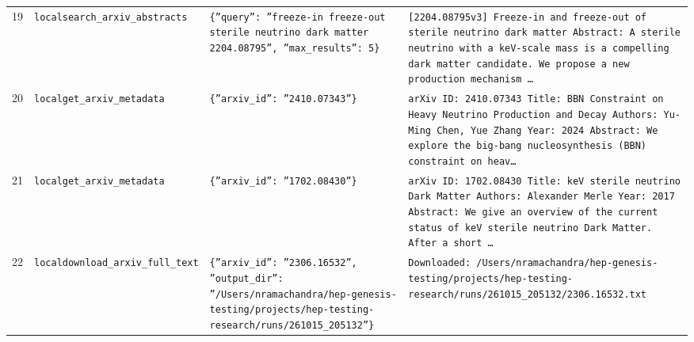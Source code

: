 \documentclass[11pt,a4paper]{article}
\begin{document}
\begin{longtable}{@{}p{}p{}p{}p{}@{}}
19 & \texttt{local}\newline\texttt{search\_\allowbreak{}arxiv\_\allowbreak{}abstracts} & \texttt{\{''query'':\allowbreak{} ''freeze-in freeze-out sterile neutrino dark matter 2204.08795'',\allowbreak{} ''max\_\allowbreak{}results'':\allowbreak{} 5\}\allowbreak{}} & \texttt{[2204.08795v3]\allowbreak{} Freeze-in and freeze-out of sterile neutrino dark matter Abstract:\allowbreak{} A sterile neutrino with a keV-scale mass is a compelling dark matter candidate. We propose a new production mechanism \ldots{}\allowbreak{}} \\
20 & \texttt{local}\newline\texttt{get\_\allowbreak{}arxiv\_\allowbreak{}metadata} & \texttt{\{''arxiv\_\allowbreak{}id'':\allowbreak{} ''2410.07343''\}\allowbreak{}} & \texttt{arXiv ID:\allowbreak{} 2410.07343 Title:\allowbreak{} BBN Constraint on Heavy Neutrino Production and Decay Authors:\allowbreak{} Yu-Ming Chen,\allowbreak{} Yue Zhang Year:\allowbreak{} 2024 Abstract:\allowbreak{} We explore the big-bang nucleosynthesis (BBN)\allowbreak{} constraint on heav\ldots{}\allowbreak{}} \\
21 & \texttt{local}\newline\texttt{get\_\allowbreak{}arxiv\_\allowbreak{}metadata} & \texttt{\{''arxiv\_\allowbreak{}id'':\allowbreak{} ''1702.08430''\}\allowbreak{}} & \texttt{arXiv ID:\allowbreak{} 1702.08430 Title:\allowbreak{} keV sterile neutrino Dark Matter Authors:\allowbreak{} Alexander Merle Year:\allowbreak{} 2017 Abstract:\allowbreak{} We give an overview of the current status of keV sterile neutrino Dark Matter. After a short \ldots{}\allowbreak{}} \\
22 & \texttt{local}\newline\texttt{download\_\allowbreak{}arxiv\_\allowbreak{}full\_\allowbreak{}text} & \texttt{\{''arxiv\_\allowbreak{}id'':\allowbreak{} ''2306.16532'',\allowbreak{} ''output\_\allowbreak{}dir'':\allowbreak{} ''/\allowbreak{}Users/\allowbreak{}nramachandra/\allowbreak{}hep-genesis-testing/\allowbreak{}projects/\allowbreak{}hep-testing-research/\allowbreak{}runs/\allowbreak{}261015\_\allowbreak{}205132''\}\allowbreak{}} & \texttt{Downloaded:\allowbreak{} /\allowbreak{}Users/\allowbreak{}nramachandra/\allowbreak{}hep-genesis-testing/\allowbreak{}projects/\allowbreak{}hep-testing-research/\allowbreak{}runs/\allowbreak{}261015\_\allowbreak{}205132/\allowbreak{}2306.16532.txt} \\

\end{longtable}
\end{document}
